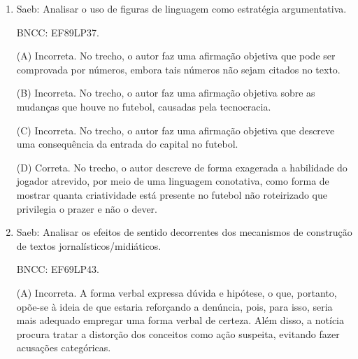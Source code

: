 \begin{enumerate}
(B) Incorreta. Velocidade e força são características apenas do futebol
do dever, conforme explicitado no texto.

(C) Correta. Monotonia relaciona-se aos trechos ``não é organizado para
ser jogado, mas para impedir que se jogue'' e ``renuncia à alegria,
atrofia a fantasia e proíbe a ousadia''. Divertimento está associado ao
trecho ``Por sorte ainda aparece nos campos {[}...{]} algum atrevido que
sai do roteiro e comete o disparate de driblar o time adversário
inteirinho, além do juiz e do público das arquibancadas''.

(D) Incorreta. O texto fala do futebol como prática profissional,
associando-o a um jogo mais pragmático e roteirizado. Entretanto, a
criatividade não é associada pelo autor ao futebol de várzea. Ele diz
que, por sorte, ainda se encontra um representante do futebol do prazer
nos campos profissionais.

\item

Saeb: Analisar o uso de figuras de linguagem como estratégia
argumentativa.

BNCC: EF89LP37.

(A) Incorreta. No trecho, o autor faz uma afirmação objetiva que pode
ser comprovada por números, embora tais números não sejam citados no texto.

(B) Incorreta. No trecho, o autor faz uma afirmação objetiva sobre as
mudanças que houve no futebol, causadas pela tecnocracia.

(C) Incorreta. No trecho, o autor faz uma afirmação objetiva que
descreve uma consequência da entrada do capital no futebol.

(D) Correta. No trecho, o autor descreve de forma exagerada a habilidade
do jogador atrevido, por meio de uma linguagem conotativa, como forma de
mostrar quanta criatividade está presente no futebol não roteirizado que
privilegia o prazer e não o dever.

\item

Saeb: Analisar os efeitos de sentido decorrentes dos mecanismos de
construção de textos jornalísticos/midiáticos.

BNCC: EF69LP43.

(A) Incorreta. A forma verbal expressa dúvida e hipótese, o que, portanto, opõe-se à ideia de que
estaria reforçando a denúncia, pois, para isso, seria mais adequado
empregar uma forma verbal de certeza. Além disso, a notícia procura
tratar a distorção dos conceitos como ação suspeita, evitando fazer
acusações categóricas.


\end{enumerate}
